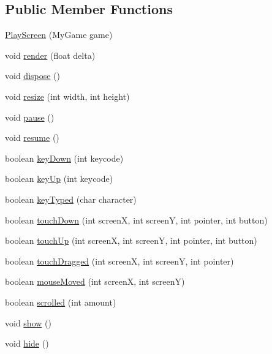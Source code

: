 \subsection*{Public Member Functions}
\begin{DoxyCompactItemize}
\item 
\hyperlink{classbattle_1_1gui_1_1_play_screen_a3c9f332f257b84b1db61b53e5aefc2f5}{Play\+Screen} (My\+Game game)
\item 
void \hyperlink{classbattle_1_1gui_1_1_play_screen_ae7d12c7ad32c50572a6eb9fac6bf167b}{render} (float delta)
\item 
void \hyperlink{classbattle_1_1gui_1_1_play_screen_a714af15cb4a54e49f89d5c4c7cea0dd0}{dispose} ()
\item 
void \hyperlink{classbattle_1_1gui_1_1_play_screen_aaa32de257857188f6b6b1b166c162db7}{resize} (int width, int height)
\item 
void \hyperlink{classbattle_1_1gui_1_1_play_screen_aa1cab880c6b0067ee40b8f0691972537}{pause} ()
\item 
void \hyperlink{classbattle_1_1gui_1_1_play_screen_a570863cc40b1168f4eceb9998d1ba630}{resume} ()
\item 
boolean \hyperlink{classbattle_1_1gui_1_1_play_screen_a7d2b40f0e248cf5cb0665119568e7a8a}{key\+Down} (int keycode)
\item 
boolean \hyperlink{classbattle_1_1gui_1_1_play_screen_a8de890bf09e5ec45f3d48b046526acfe}{key\+Up} (int keycode)
\item 
boolean \hyperlink{classbattle_1_1gui_1_1_play_screen_ab554b1100bbfc996f125803323833478}{key\+Typed} (char character)
\item 
boolean \hyperlink{classbattle_1_1gui_1_1_play_screen_acd5f3982ebfb877da0a352e2a73c15df}{touch\+Down} (int screen\+X, int screen\+Y, int pointer, int button)
\item 
boolean \hyperlink{classbattle_1_1gui_1_1_play_screen_aefb5e704f9448903efba4a9b61d0412b}{touch\+Up} (int screen\+X, int screen\+Y, int pointer, int button)
\item 
boolean \hyperlink{classbattle_1_1gui_1_1_play_screen_a67646231ba548e8cd15c8593d38f831d}{touch\+Dragged} (int screen\+X, int screen\+Y, int pointer)
\item 
boolean \hyperlink{classbattle_1_1gui_1_1_play_screen_afde423ff9948f592be2eb28eb845a424}{mouse\+Moved} (int screen\+X, int screen\+Y)
\item 
boolean \hyperlink{classbattle_1_1gui_1_1_play_screen_a6c3895dc4c796f1b907c33878b9f2147}{scrolled} (int amount)
\item 
void \hyperlink{classbattle_1_1gui_1_1_play_screen_abc2492468ae46be7ba327511c9c5d640}{show} ()
\item 
void \hyperlink{classbattle_1_1gui_1_1_play_screen_ac56fd67353ba4e7b39ca1128d47ba9c7}{hide} ()
\end{DoxyCompactItemize}
